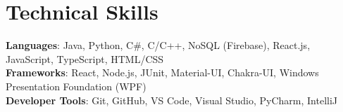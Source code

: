 \documentclass[letterpaper,11pt]{article}
\begin{document}
%
\section{Technical Skills}
 \begin{itemize}[leftmargin=0.15in, label={}]
    \small{\item{
     \textbf{Languages}{: Java, Python, C\#, C/C++, NoSQL (Firebase), React.js, JavaScript, TypeScript, HTML/CSS} \\
     \textbf{Frameworks}{: React, Node.js, JUnit, Material-UI, Chakra-UI, Windows Presentation Foundation (WPF)} \\
     \textbf{Developer Tools}{: Git, GitHub, VS Code, Visual Studio, PyCharm, IntelliJ} \\
    }}
 \end{itemize}


\end{document}
